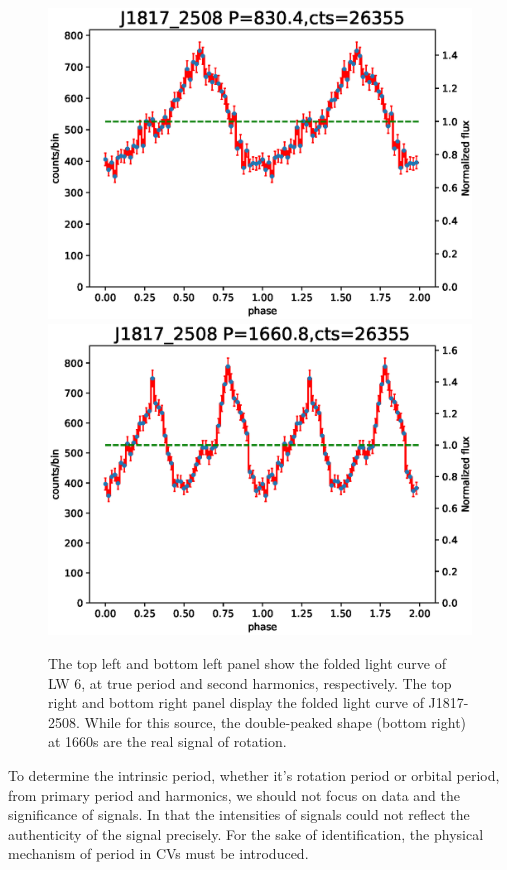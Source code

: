 \documentclass[fleqn,usenatbib]{mnras}
\begin{document}
\begin{figure}
\begin{minipage}[b]{0.45\textwidth}
\includegraphics[width=\textwidth]{./figure/CV/pfold_lc_J1817_2508_spin_half.eps}
\includegraphics[width=\textwidth]{./figure/CV/pfold_lc_J1817_2508_spin.eps}
\end{minipage}
\caption{The top left and bottom left panel show the folded light curve of LW 6, at true period and second harmonics, respectively. The top right and bottom right panel display the folded light curve of J1817-2508. While for this source, the double-peaked shape (bottom right) at 1660s are the real signal of rotation. \label{fig:6thfig}}
\end{figure}
\indent
To determine the intrinsic period, whether it's rotation period or orbital period, from primary period and harmonics, we should not focus on data and the significance of signals. In that the intensities of signals could not reflect the authenticity of the signal precisely. For the sake of  identification, the physical mechanism of period in CVs must be introduced. 
\end{document}
